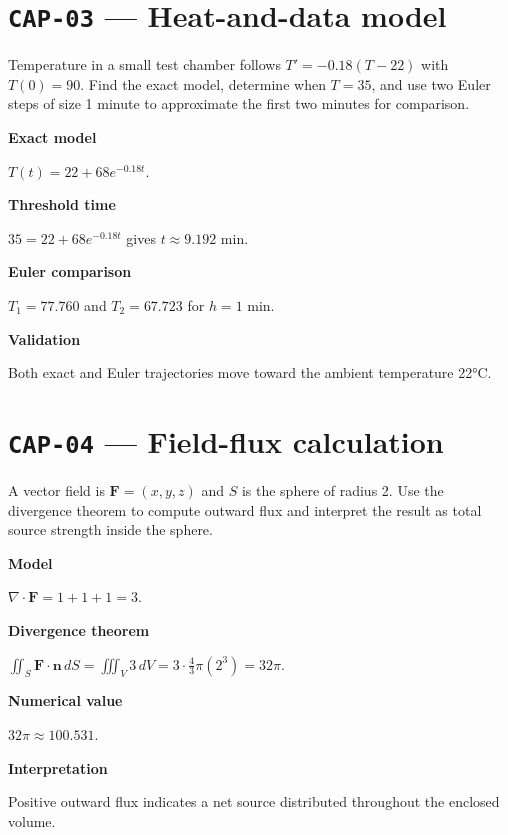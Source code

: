 \documentclass[11pt]{book}
\newcommand{\pid}[1]{\texttt{#1}}
\begin{document}
\section*{\pid{CAP-03} — Heat-and-data model}
\begin{problembox}Temperature in a small test chamber follows $T'= -0.18(T-22)$ with $T(0)=90$. Find the exact model, determine when $T=35$, and use two Euler steps of size 1 minute to approximate the first two minutes for comparison.\end{problembox}
\begin{solutionbox}
\textbf{Exact model}\par $T(t)=22+68e^{-0.18t}$.\par\medskip
\textbf{Threshold time}\par $35=22+68e^{-0.18t}$ gives $t\approx 9.192$ min.\par\medskip
\textbf{Euler comparison}\par $T_1=77.760$ and $T_2=67.723$ for $h=1$ min.\par\medskip
\textbf{Validation}\par Both exact and Euler trajectories move toward the ambient temperature 22°C.\par\medskip
\end{solutionbox}
\section*{\pid{CAP-04} — Field-flux calculation}
\begin{problembox}A vector field is $\mathbf F=(x,y,z)$ and $S$ is the sphere of radius 2. Use the divergence theorem to compute outward flux and interpret the result as total source strength inside the sphere.\end{problembox}
\begin{solutionbox}
\textbf{Model}\par $\nabla\cdot\mathbf F=1+1+1=3$.\par\medskip
\textbf{Divergence theorem}\par $\iint_S\mathbf F\cdot\mathbf n\,dS=\iiint_V3\,dV=3\cdot\frac43\pi(2^3)=32\pi$.\par\medskip
\textbf{Numerical value}\par $32\pi\approx 100.531$.\par\medskip
\textbf{Interpretation}\par Positive outward flux indicates a net source distributed throughout the enclosed volume.\par\medskip
\end{solutionbox}
\end{document}
